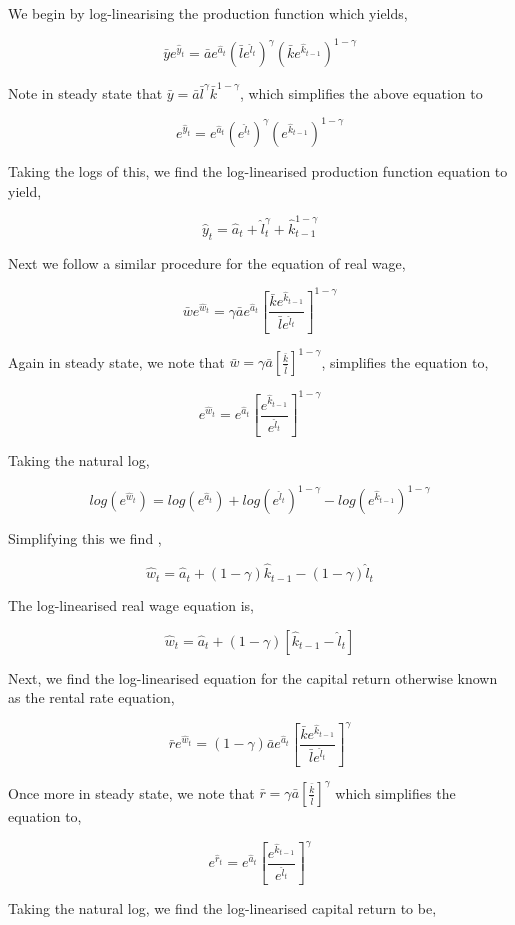\documentclass[
  11pt,
  justified]{article}
\begin{document}
We begin by log-linearising the production function which yields,

\[
\bar y e^{\hat y_t} = \bar a e^{\hat a_t} (\bar l e^{\hat l_t})^{\gamma} (\bar k e^{\hat k_{t-1}})^{1 - \gamma}
\]

Note in steady state that
\(\bar y = \bar a \bar l^{\gamma} \bar k^{1 - \gamma}\), which
simplifies the above equation to

\[
e^{\hat y_t} = e^{\hat a_t} (e^{\hat l_t})^{\gamma} (e^{\hat k_{t-1}})^{1 - \gamma}
\]

Taking the logs of this, we find the log-linearised production function
equation to yield,

\[
\hat y_t = \hat a_t + \hat l_t^{\gamma}  + \hat k_{t-1}^{1 - \gamma}
\]

Next we follow a similar procedure for the equation of real wage,

\[
\bar w e^{\hat w_t} = \gamma \bar a e^{\hat a_t} [\frac{\bar k e^{\hat k_{t-1}}}{ \bar l e^{\hat l_t}}]^{1 - \gamma}
\]

Again in steady state, we note that
\(\bar w = \gamma \bar a [\frac{\bar k}{\bar l}]^{1- \gamma}\),
simplifies the equation to,

\[
e^{\hat w_t} = e^{\hat a_t} [\frac{e^{\hat k_{t-1}}}{e^{\hat l_t}}]^{1 - \gamma}
\]

Taking the natural log,

\[
log(e^{\hat w_t}) = log(e^{\hat a_t}) + log(e^{\hat l_t})^{1- \gamma} - log(e^{\hat k_{t-1}})^{1- \gamma}
\]

Simplifying this we find ,

\[
\hat w_t = \hat a_t + (1- \gamma)\hat k_{t-1} - (1- \gamma)\hat l_t
\]

The log-linearised real wage equation is,

\[
\hat w_t = \hat a_t + (1- \gamma)[\hat k_{t-1} - \hat l_t]
\]

Next, we find the log-linearised equation for the capital return
otherwise known as the rental rate equation,

\[
\bar r e^{\hat w_t} = (1-\gamma) \bar a e^{\hat a_t} [\frac{\bar k e^{\hat k_{t-1}}}{ \bar l e^{\hat l_t}}]^{\gamma}
\]

Once more in steady state, we note that
\(\bar r = \gamma \bar a [\frac{\bar k}{\bar l}]^{ \gamma}\) which
simplifies the equation to,

\[
e^{\hat r_t} = e^{\hat a_t} [\frac{e^{\hat k_{t-1}}}{e^{\hat l_t}}]^{\gamma}
\]

Taking the natural log, we find the log-linearised capital return to be,
\end{document}

